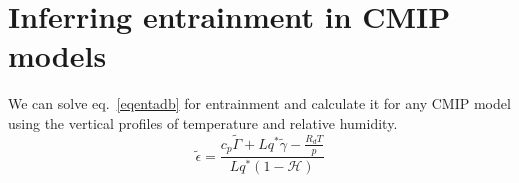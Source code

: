 \documentclass{article}
\begin{document}
\section{Inferring entrainment in CMIP models}
We can solve eq.~\ref{eqentadb} for entrainment and calculate it for any CMIP model using the vertical profiles of temperature and relative humidity.
\begin{equation}
\tilde{\epsilon} = \frac{c_p \tilde{\Gamma} + Lq^*\tilde{\gamma} - \frac{R_dT}{p} }{Lq^* (1 - \mathcal{H})}
\end{equation}


\end{document}
